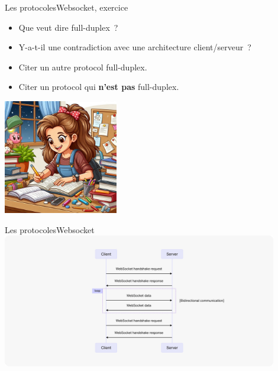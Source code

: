 \documentclass{beamer}
\begin{document}
    \begin{frame}{Les protocoles}{Websocket, exercice \execcounterdispinc}
        \begin{itemize}
            \item Que veut dire full-duplex~?
            \item Y-a-t-il une contradiction avec une architecture client/serveur~?
            \item Citer un autre protocol full-duplex.
            \item Citer un protocol qui \textbf{n'est pas} full-duplex.
        \end{itemize}
        \bigbreak
        \centering
        \includegraphics[width=5cm]{image/homework}
    \end{frame}

    \begin{frame}{Les protocoles}{Websocket\label{sendbird-protocole}}
        \centering
        \includegraphics[width=12cm]{image/tutorial-websocket-protocol-chart}
    \end{frame}
\end{document}
